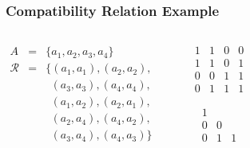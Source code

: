 \documentclass[dvipsnames]{beamer}
\begin{document}
\begin{frame}
  \frametitle{Compatibility Relation Example}

  \begin{columns}
    \begin{eqnarray*}
      A           & = & \{a_1,a_2,a_3,a_4\}\\
      \mathcal{R} & = & \{(a_1,a_1),(a_2,a_2),\\
		  &   & ~~(a_3,a_3),(a_4,a_4),\\
		  &   & ~~(a_1,a_2),(a_2,a_1),\\
		  &   & ~~(a_2,a_4),(a_4,a_2),\\
		  &   & ~~(a_3,a_4),(a_4,a_3)\}
    \end{eqnarray*}

    \begin{center}

      \bigskip
    \end{center}

    \pause
    \begin{center}
      \[
	\begin{array}{|cccc|}
	  1  &  1  &  0  &  0\\
	  1  &  1  &  0  &  1\\
	  0  &  0  &  1  &  1\\
	  0  &  1  &  1  &  1
	\end{array}
      \]

      \[
	\begin{array}{|ccc|}
	  1  &     & \\
	  0  &  0  & \\
	  0  &  1  &  1
	\end{array}
      \]
    \end{center}
  \end{columns}
\end{frame}
\end{document}
